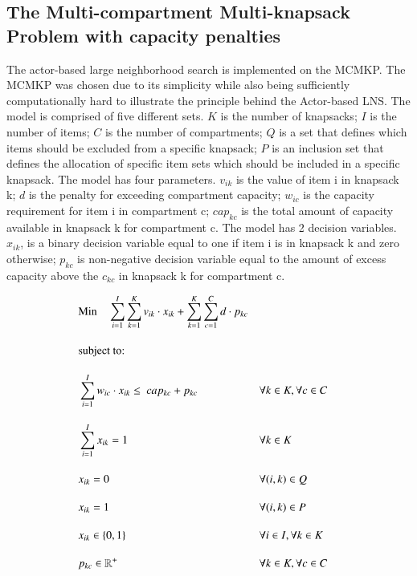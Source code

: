 \documentclass[preprint,12pt,authoryear]{elsarticle}
\begin{document}
\subsection{The Multi-compartment Multi-knapsack Problem with capacity penalties}
\label{sub1sec2}
The actor-based large neighborhood search is implemented on the MCMKP. The MCMKP was chosen due to its simplicity
while also being sufficiently computationally hard to illustrate the principle behind the Actor-based LNS. The model is comprised of 
five different sets. $K$ is the number of knapsacks; $I$ is the number of items; $C$ is the number of compartments; $Q$ is a set that
defines which items should be excluded from a specific knapsack; $P$ is an inclusion set that defines the allocation of specific item sets 
which should be included in a specific knapsack. The model has four parameters. $v_{ik}$ is the value of item i in knapsack k; $d$ is the 
penalty for exceeding compartment capacity; $w_{ic}$ is the capacity requirement for item i in compartment c; $cap_{kc}$ is the total amount 
of capacity available in knapsack k for compartment c. The model has 2 decision variables. $x_{ik}$, is a binary decision variable equal to one 
if item i is in knapsack k and zero otherwise; $p_{kc}$ is non-negative decision variable equal to the amount of excess capacity above 
the $c_{kc}$ in knapsack k for compartment c. 

\begin{alignat}{2}
	& \text{Min} \quad \sum_{i = 1}^{I} \sum_{k = 1}^{K} v_{ik} \cdot x_{ik} + \sum_{k = 1}^{K} \sum_{c = 1}^C d \cdot p_{kc}   \label{eqn:objective_function_strategic} \\[1em]
    & \text{subject to:} \notag                                                                                                                                        \\[1em]
	& \sum_{i=1}^I w_{ic} \cdot x_{ik} \leq \ cap_{kc} + p_{kc}        && \forall k \in K, \forall c \in C                      \label{eqn:capacity_constraint}          \\[1em]
	& \sum_{i = 1}^{I} x_{ik} = 1                                      && \forall k \in K                                       \label{eqn:single_workorder_constraint}  \\[1em]
	& x_{ik} = 0                                                       && \forall (i, k) \in Q                                  \label{eqn:exclusion_constraint}         \\[1em]
	& x_{ik} = 1                                                       && \forall (i, k) \in P                                  \label{eqn:inclusion_constraint}         \\[1em]
	& x_{ik} \in \{0, 1\}                                              && \forall i \in I, \forall k \in K                      \label{eqn:x_integrality_constraint}     \\[1em] 
	& p_{kc} \in \mathbb{R}^{+}                                        && \forall k \in K, \forall c \in C                      \label{eqn:p_non_negativity_constraint}
\end{alignat}
\end{document}
